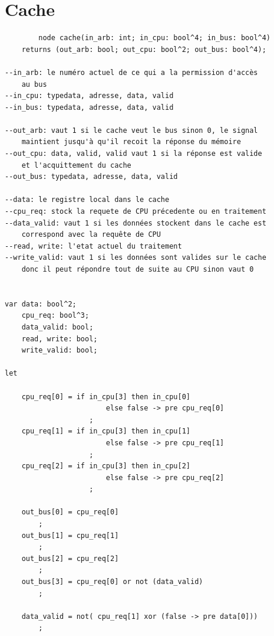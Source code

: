 \documentclass[a4paper,11pt]{report}
\begin{document}
\chapter{Cache}
	\begin{framed}
		\begin{verbatim}
		node cache(in_arb: int; in_cpu: bool^4; in_bus: bool^4)
    returns (out_arb: bool; out_cpu: bool^2; out_bus: bool^4);

--in_arb: le numéro actuel de ce qui a la permission d'accès 
	au bus
--in_cpu: typedata, adresse, data, valid
--in_bus: typedata, adresse, data, valid

--out_arb: vaut 1 si le cache veut le bus sinon 0, le signal 
	maintient jusqu'à qu'il recoit la réponse du mémoire
--out_cpu: data, valid, valid vaut 1 si la réponse est valide 
	et l'acquittement du cache
--out_bus: typedata, adresse, data, valid

--data: le registre local dans le cache
--cpu_req: stock la requete de CPU précedente ou en traitement
--data_valid: vaut 1 si les données stockent dans le cache est 
	correspond avec la requête de CPU
--read, write: l'etat actuel du traitement
--write_valid: vaut 1 si les données sont valides sur le cache 
	donc il peut répondre tout de suite au CPU sinon vaut 0


var data: bool^2;
    cpu_req: bool^3;
    data_valid: bool;
    read, write: bool;
    write_valid: bool;

let

    cpu_req[0] = if in_cpu[3] then in_cpu[0] 
    					else false -> pre cpu_req[0]
                    ;
    cpu_req[1] = if in_cpu[3] then in_cpu[1] 
    					else false -> pre cpu_req[1]
                    ;
    cpu_req[2] = if in_cpu[3] then in_cpu[2] 
    					else false -> pre cpu_req[2]
                    ;

    out_bus[0] = cpu_req[0]
        ;
    out_bus[1] = cpu_req[1]
        ;
    out_bus[2] = cpu_req[2]
        ;
    out_bus[3] = cpu_req[0] or not (data_valid)
        ;

    data_valid = not( cpu_req[1] xor (false -> pre data[0]))
        ;


\end{verbatim}
\end{framed}
\end{document}
